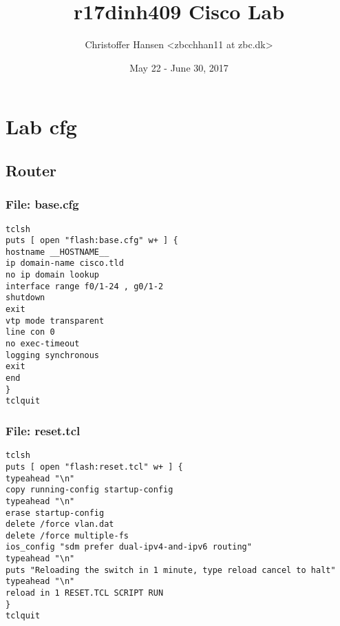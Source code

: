 \documentclass{article}
\begin{document}
\title{r17dinh409 Cisco Lab}
\author{Christoffer Hansen <zbcchhan11 at zbc.dk>}
\date{May 22 - June 30, 2017}
\maketitle

\newpage
\tableofcontents


%
%
\section{Lab cfg}


\subsection{Router}

\subsubsection{File: base.cfg}

\begin{verbatim}
tclsh
puts [ open "flash:base.cfg" w+ ] {
hostname __HOSTNAME__
ip domain-name cisco.tld
no ip domain lookup
interface range f0/1-24 , g0/1-2
shutdown
exit
vtp mode transparent
line con 0
no exec-timeout
logging synchronous
exit
end
}
tclquit
\end{verbatim}

\subsubsection{File: reset.tcl}

\begin{verbatim}
tclsh
puts [ open "flash:reset.tcl" w+ ] {
typeahead "\n"
copy running-config startup-config
typeahead "\n"
erase startup-config
delete /force vlan.dat
delete /force multiple-fs
ios_config "sdm prefer dual-ipv4-and-ipv6 routing"
typeahead "\n"
puts "Reloading the switch in 1 minute, type reload cancel to halt"
typeahead "\n"
reload in 1 RESET.TCL SCRIPT RUN
}
tclquit
\end{verbatim}
\end{document}
